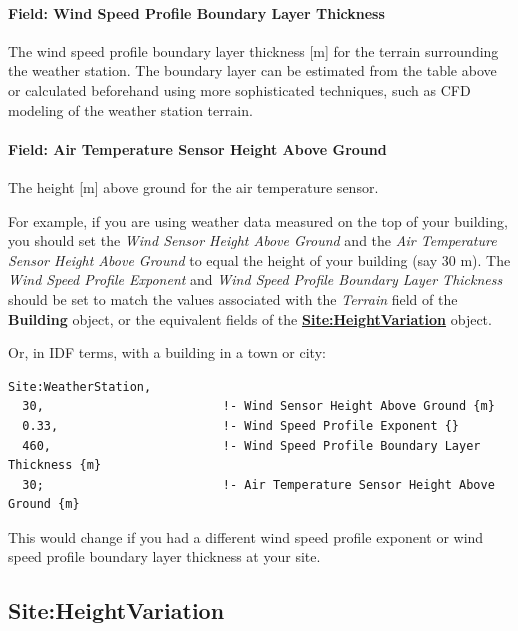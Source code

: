 \paragraph{Field: Wind Speed Profile Boundary Layer Thickness}\label{field-wind-speed-profile-boundary-layer-thickness}

The wind speed profile boundary layer thickness {[}m{]} for the terrain surrounding the weather station. The boundary layer can be estimated from the table above or calculated beforehand using more sophisticated techniques, such as CFD modeling of the weather station terrain.

\paragraph{Field: Air Temperature Sensor Height Above Ground}\label{field-air-temperature-sensor-height-above-ground}

The height {[}m{]} above ground for the air temperature sensor.

For example, if you are using weather data measured on the top of your building, you should set the \emph{Wind Sensor Height Above Ground} and the \emph{Air Temperature Sensor Height Above Ground} to equal the height of your building (say 30 m). The \emph{Wind Speed Profile Exponent} and \emph{Wind Speed Profile Boundary Layer Thickness} should be set to match the values associated with the \emph{Terrain} field of the \textbf{Building} object, or the equivalent fields of the \textbf{\hyperref[siteheightvariation]{Site:HeightVariation}} object.

Or, in IDF terms, with a building in a town or city:

\begin{lstlisting}
Site:WeatherStation,
  30,                         !- Wind Sensor Height Above Ground {m}
  0.33,                       !- Wind Speed Profile Exponent {}
  460,                        !- Wind Speed Profile Boundary Layer Thickness {m}
  30;                         !- Air Temperature Sensor Height Above Ground {m}
\end{lstlisting}

This would change if you had a different wind speed profile exponent or wind speed profile boundary layer thickness at your site.

\subsection{Site:HeightVariation}\label{siteheightvariation}

